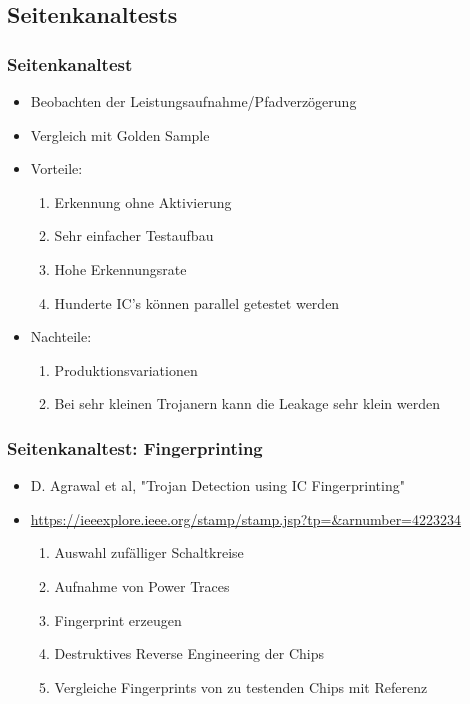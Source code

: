 \documentclass[11pt]{beamer}
\begin{document}
\subsection{Seitenkanaltests}
\begin{frame}
    \frametitle{Seitenkanaltest}
    \begin{itemize}
        \item Beobachten der Leistungsaufnahme/Pfadverzögerung \item Vergleich mit Golden Sample
        \item Vorteile:
        \begin{enumerate}
            \item Erkennung ohne Aktivierung
            \item Sehr einfacher Testaufbau
            \item Hohe Erkennungsrate
            \item Hunderte IC's können parallel getestet werden
        \end{enumerate}
        \item Nachteile:
        \begin{enumerate}
            \item Produktionsvariationen
            \item Bei sehr kleinen Trojanern kann die Leakage sehr klein werden
        \end{enumerate}
    \end{itemize}
\end{frame}
\begin{frame}
    \frametitle{Seitenkanaltest: Fingerprinting}
    \begin{itemize}
        \item D. Agrawal et al, "Trojan Detection using IC Fingerprinting"
        \item \url{https://ieeexplore.ieee.org/stamp/stamp.jsp?tp=&arnumber=4223234}
        \begin{enumerate}
            \item Auswahl zufälliger Schaltkreise
            \item Aufnahme von Power Traces
            \item Fingerprint erzeugen
            \item Destruktives Reverse Engineering der Chips
            \item Vergleiche Fingerprints von zu testenden Chips mit Referenz
        \end{enumerate}
    \end{itemize}
\end{frame}
\end{document}
